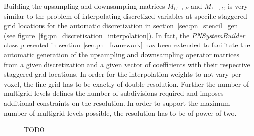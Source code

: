 Building the upsampling and downsampling matrices $M_{C\rightarrow F}$ and $M_{F\rightarrow C}$ is very similar to the problem of interpolating discretized variables at specific staggered grid locations for the automatic discretization in section~\ref{sec:pn_stencil_gen} (see figure~\ref{fig:pn_discretization_interpolation}). In fact, the \emph{PNSystemBuilder} class presented in section~\ref{sec:pn_framework} has been extended to facilitate the automatic generation of the upsampling and downsampling operator matrices from a given discretization and a given vector of coefficients with their respective staggered grid locations. In order for the interpolation weights to not vary per voxel, the fine grid has to be exactly of double resolution. Further the number of multigrid levels defines the number of subdivisions required and imposes additional constraints on the resolution. In order to support the maximum number of multigrid levels possible, the resolution has to be of power of two.
\begin{figure}[h]
\centering
{}
\caption{TODO}
\label{fig:da_solver_multigrid_M}
\end{figure}

